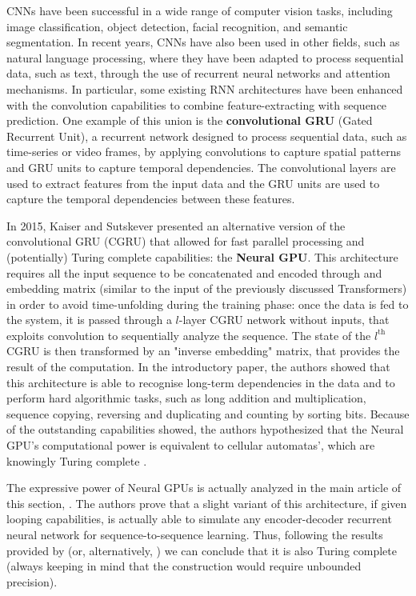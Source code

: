 \documentclass{article}
\begin{document}
CNNs have been successful in a wide range of computer vision tasks, including image classification, object detection, facial recognition, and semantic segmentation. In recent years, CNNs have also been used in other fields, such as natural language processing, where they have been adapted to process sequential data, such as text, through the use of recurrent neural networks and attention mechanisms. In particular, some existing RNN architectures have been enhanced with the convolution capabilities to combine feature-extracting with sequence prediction. One example of this union is the \textbf{convolutional GRU} (Gated Recurrent Unit), a recurrent network designed to process sequential data, such as time-series or video frames, by applying convolutions to capture spatial patterns and GRU units to capture temporal dependencies. The convolutional layers are used to extract features from the input data and the GRU units are used to capture the temporal dependencies between these features.

In 2015, Kaiser and Sutskever \cite{KAI15} presented an alternative version of the convolutional GRU (CGRU) that allowed for fast parallel processing and (potentially) Turing complete capabilities: the \textbf{Neural GPU}. This architecture requires all the input sequence to be concatenated and encoded through and embedding matrix (similar to the input of the previously discussed Transformers) in order to avoid time-unfolding during the training phase: once the data is fed to the system, it is passed through a $l$-layer CGRU network without inputs, that exploits convolution to sequentially analyze the sequence. The state of the $l^{\textrm{th}}$ CGRU is then transformed by an "inverse embedding" matrix, that provides the result of the computation. In the introductory paper, the authors showed that this architecture is able to recognise long-term dependencies in the data and to perform hard algorithmic tasks, such as long addition and multiplication, sequence copying, reversing and duplicating and counting by sorting bits. Because of the outstanding capabilities showed, the authors hypothesized that the Neural GPU's computational power is equivalent to cellular automatas', which are knowingly Turing complete \cite{COO04}.

The expressive power of Neural GPUs is actually analyzed in the main article of this section, \cite{PER19}. The authors prove that a slight variant of this architecture, if given looping capabilities, is actually able to simulate any encoder-decoder recurrent neural network for sequence-to-sequence learning. Thus, following the results provided by \cite{SIE95} (or, alternatively, \cite{CHU21}) we can conclude that it is also Turing complete (always keeping in mind that the construction would require unbounded precision).
\end{document}
